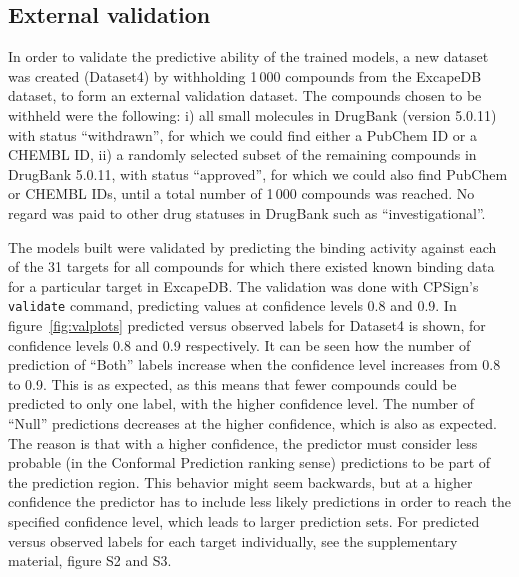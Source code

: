 \documentclass[10pt,article]{memoir}
\begin{document}
\subsection*{External validation}

In order to validate the predictive ability of the trained models, a new
dataset was created (Dataset4) by withholding 1\,000 compounds from the
ExcapeDB dataset, to form an external validation dataset. The compounds chosen
to be withheld were the following: i) all small molecules in DrugBank (version
5.0.11) with status ``withdrawn'', for which we could find either a PubChem ID
or a CHEMBL ID, ii) a randomly selected subset of the remaining compounds in
DrugBank 5.0.11, with status ``approved'', for which we could also find PubChem
or CHEMBL IDs, until a total number of 1\,000 compounds was reached.  No regard
was paid to other drug statuses in DrugBank such as ``investigational''.

The models built were validated by predicting the binding activity against each
of the 31 targets for all compounds for which there existed known binding data
for a particular target in ExcapeDB. The validation was done with CPSign's
\texttt{validate} command, predicting values at confidence levels 0.8 and 0.9.
%
In figure~\ref{fig:valplots} predicted versus observed labels for Dataset4 is
shown, for confidence levels 0.8 and 0.9 respectively. It can be seen how the
number of prediction of ``Both'' labels increase when the confidence level
increases from 0.8 to 0.9. This is as expected, as this means that fewer
compounds could be predicted to only one label, with the higher confidence
level. The number of ``Null'' predictions decreases at the higher confidence,
which is also as expected. The reason is that with a higher confidence, the
predictor must consider less probable (in the Conformal Prediction ranking
sense) predictions to be part of the prediction region. This behavior might seem
backwards, but at a higher confidence the predictor has to include less likely
predictions in order to reach the specified confidence level, which leads to
larger prediction sets. For predicted versus observed labels for each target
individually, see the supplementary material, figure S2 and S3.
\end{document}

